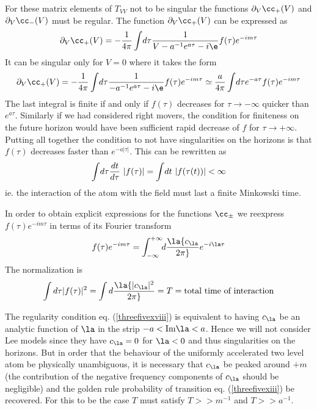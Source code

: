 \documentclass[12pt]{article}
\begin{document}
For these matrix elements of $T_{VV}$ not to be singular the functions $
\partial_V
\cc_+(V) $ and $
\partial_V \cc_-(V) $ must be regular.
The function $ \partial_V
\cc_+(V) $ can be expressed as
\begin{equation} \partial_V \cc_+(V) = -{1 \over 4
\pi} \int \! d \tau {1 \over V - a^{-1}e^{a\tau} - i \e} f(\tau)e^{-im\tau}
\label{threefivexvi} \end{equation}
It can be singular only for $V=0$ where
it takes the form  \begin{equation} \partial_V \cc_+(V) = -{1 \over 4 \pi} \int
\! d
\tau {1 \over -
a^{-1}e^{a\tau} - i \e } f(\tau)e^{-im\tau} \simeq  {a \over 4 \pi} \int \! d
\tau e^{-a\tau} f(\tau)e^{-im\tau} \label{threefivexvii} \end{equation} The
last integral is finite if and only if $f(\tau)$ decreases for $\tau
\rightarrow -\infty$ quicker than $e^{a\tau}$. Similarly if we had considered
right movers, the condition for finiteness on the future horizon would have
been sufficient rapid decrease of $f$ for $\tau \rightarrow +\infty$. Putting
all together the condition to not have singularities on the horizons is that
$f(\tau)$ decreases faster than
$e^{-a \vert \tau \vert}$.
This can be rewritten as
\begin{equation} \int \! d \tau {d t \over d \tau } \ \vert f(\tau)\vert =
\int \! dt \ \vert f(\tau(t))\vert < \infty \label{threefivexviii}
\end{equation}
ie. the interaction of the atom with the field must last a finite
Minkowski time.


In order to obtain explicit expressions for the functions $\cc_\pm$ we
reexpress $f(\tau)e^{-im\tau}$ in terms of its Fourier transform
\begin{equation} f(\tau)e^{-im\tau} =
\int_{-\infty}^{+\infty}\!\! d\la { c_\la \over 2 \pi} e^{-i \la \tau}
\label{threefivexix}
\end{equation}
The normalization is
\begin{equation}
\int d \tau \vert f(\tau) \vert ^2 =  \int d\la { \vert c_\la \vert^2 \over 2
\pi} = T =\hbox{total time of interaction} \label{threefivexx}
\end{equation}

The regularity condition eq. (\ref{threefivexviii})
is equivalent to having $c_\la$ be an
analytic function of $\la$ in the strip $-a < {\rm Im} \la < a$. Hence we
will not consider Lee models since they
have $c_\la=0$ for $\la<0$ and thus singularities on the horizons.
But in order that the behaviour of the uniformly accelerated two level atom
be physically
unambiguous, it is necessary that $c_\la$ be peaked around
$+m$
(the contribution of the negative frequency components of $c_\la$ should be
negligible) and  the golden rule probability of transition
eq. (\ref{threefivexiii}) be recovered. For this to
be the case $T$ must satisfy
 $T >>  m^{-1} $ and $T>>a^{-1} $.
\end{document}

